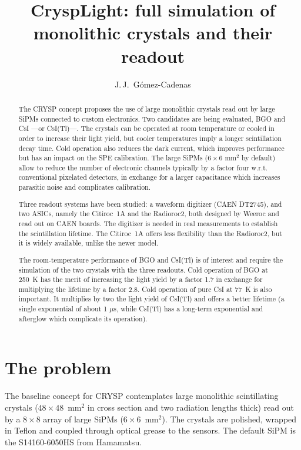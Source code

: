 \documentclass[11pt]{article}
\title{CryspLight: full simulation of monolithic crystals and their readout}
\author{J.\,J.~Gómez-Cadenas}
\date{}
\begin{document}
\maketitle

\begin{abstract}
The CRYSP concept proposes the use of large monolithic crystals read out by large SiPMs connected to custom electronics. Two candidates are being evaluated, BGO and CsI ---or CsI(Tl)---. The crystals can be operated at room temperature or cooled in order to increase their light yield, but cooler temperatures imply a longer scintillation decay time. Cold operation also reduces the dark current, which improves performance but has an impact on the SPE calibration. The large SiPMs ($6 \times 6$ mm$^2$ by default) allow to reduce the number of electronic channels typically by a factor four w.r.t. conventional pixelated detectors, in exchange for a larger capacitance which increases parasitic noise and complicates calibration. 

Three readout systems have been studied: a waveform digitizer (CAEN DT2745), and two ASICs, namely 
the Citiroc~1A and the Radioroc2, both designed by Weeroc and read out on CAEN boards. The digitizer is needed in real measurements
to establish the scintillation lifetime. The Citiroc~1A offers less flexibility than the  Radioroc2, but it is widely available, unlike the newer model. 

The room-temperature performance of BGO and CsI(Tl) is of interest and require the simulation of the two crystals with the three readouts. Cold operation of BGO at 250~K has the merit of increasing the light yield by a factor 1.7 in exchange for multiplying the lifetime by a factor 2.8. Cold operation of pure CsI at 77~K is also important. It multiplies by two the light yield of CsI(Tl) and offers a better lifetime (a single exponential of about 1 $\mu$s, while CsI(Tl) has a long-term exponential and afterglow which complicate its operation). 


\end{abstract}

\tableofcontents

\section{The problem}
\label{sec:purpose}

The baseline concept for CRYSP contemplates large monolithic scintillating crystals
($48 \times 48$~mm$^2$ in cross section and two radiation
lengths thick) read out by a $8 \times 8$ array of large SiPMs ($6 \times 6$~mm$^2$).
The crystals are polished, wrapped in Teflon and coupled through optical grease to the sensors.
The default SiPM is the S14160-6050HS from Hamamatsu.
\end{document}
